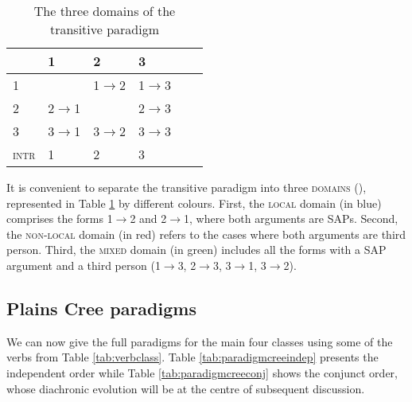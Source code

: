 \documentclass[twoside,a4paper,11pt]{article}
\newcommand{\grise}[1]{\cellcolor{lightgray}\textbf{#1}}
\newcommand{\Σ}{\greek{Σ}}
\begin{document}
\begin{table}[H] 
\caption{The three domains of the transitive paradigm} 
 \centering \label{tab:domain}
\begin{tabular}{l|lllll} 
\toprule
&1 & 2 &3\\
\hline
1 &\grise{} &1$\rightarrow$2\cellcolor[wave]{465} & 1$\rightarrow$3 \cellcolor[wave]{520} \\
2&2$\rightarrow$1\cellcolor[wave]{465}&\grise{}&2$\rightarrow$3 \cellcolor[wave]{520} \\
3&3$\rightarrow$1 \cellcolor[wave]{520}&3$\rightarrow$2 \cellcolor[wave]{520}&3$\rightarrow$3\cellcolor[wave]{650}\\
\hline
\textsc{intr}&1&2&3\\
\bottomrule
\end{tabular}
\end{table}
 
It is convenient to separate the transitive paradigm into three \textsc{domains} (\citealt[47-54]{zuniga06}), represented in Table  \ref{tab:domain} by different colours. First, the \textsc{local} domain (in blue) comprises the forms 1$\rightarrow$2 and 2$\rightarrow$1, where both arguments are SAPs. Second, the \textsc{non-local} domain (in red) refers to the cases where both arguments are third person. Third, the \textsc{mixed} domain (in green) includes all the forms with a SAP argument and a third person (1$\rightarrow$3, 2$\rightarrow$3, 3$\rightarrow$1, 3$\rightarrow$2). 


\subsection{Plains Cree paradigms}
\label{subsec:creeparadigm}
We can now give the full paradigms for the main four classes using some of the verbs from Table \ref{tab:verbclass}. Table \ref{tab:paradigmcreeindep} presents the independent order while Table \ref{tab:paradigmcreeconj} shows the conjunct order, whose diachronic evolution will be at the centre of subsequent discussion.
\end{document}
